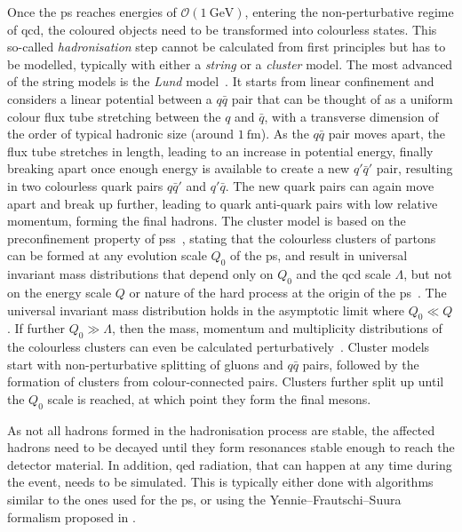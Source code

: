 Once the \gls{ps} reaches energies of $\mathcal{O}(\SI{1}{\GeV})$, entering the non-perturbative regime of \gls{qcd}, the coloured objects need to be transformed into colourless states.
This so-called \textit{hadronisation} step cannot be calculated from first principles but has to be modelled, typically with either a \textit{string} or a \textit{cluster} model. The most advanced of the string models is the \textit{Lund} model~\cite{Andersson:1983ia,andersson_1998}.
It starts from linear confinement and considers a linear potential between a $q\bar{q}$ pair that can be thought of as a uniform colour flux tube stretching between the $q$ and $\bar{q}$, with a transverse dimension of the order of typical hadronic size (\ie around $\SI{1}{\femto\meter}$). As the $q\bar{q}$ pair moves apart, the flux tube stretches in length, leading to an increase in potential energy, finally breaking apart once enough energy is available to create a new $q'\bar{q}'$ pair, resulting in two colourless quark pairs $q\bar{q}'$ and $q'\bar{q}$.
The new quark pairs can again move apart and break up further, leading to quark anti-quark pairs with low relative momentum, forming the final hadrons.
The cluster model is based on the preconfinement property of \glspl{ps}~\cite{Amati:1979fg}, stating that the colourless clusters of partons can be formed at any evolution scale $Q_0$ of the \gls{ps}, and result in universal invariant mass distributions that depend only on $Q_0$ and the \gls{qcd} scale $\Lambda$, but not on the energy scale $Q$ or nature of the hard process at the origin of the \gls{ps}~\cite{Buckley:2011ms}.
The universal invariant mass distribution holds in the asymptotic limit where $Q_0 \ll Q$. If further $Q_0 \gg \Lambda$, then the mass, momentum and multiplicity distributions of the colourless clusters can even be calculated perturbatively~\cite{Buckley:2011ms}.
Cluster models start with non-perturbative splitting of gluons and $q\bar{q}$ pairs, followed by the formation of clusters from colour-connected pairs.
Clusters further split up until the $Q_0$ scale is reached, at which point they form the final mesons.

 As not all hadrons formed in the hadronisation process are stable, the affected hadrons need to be decayed until they form resonances stable enough to reach the detector material. In addition, \gls{qed} radiation, that can happen at any time during the event, needs to be simulated. This is typically either done with algorithms similar to the ones used for the \gls{ps}, or using the Yennie--Frautschi--Suura formalism proposed in \cite{YENNIE1961379}.
 
